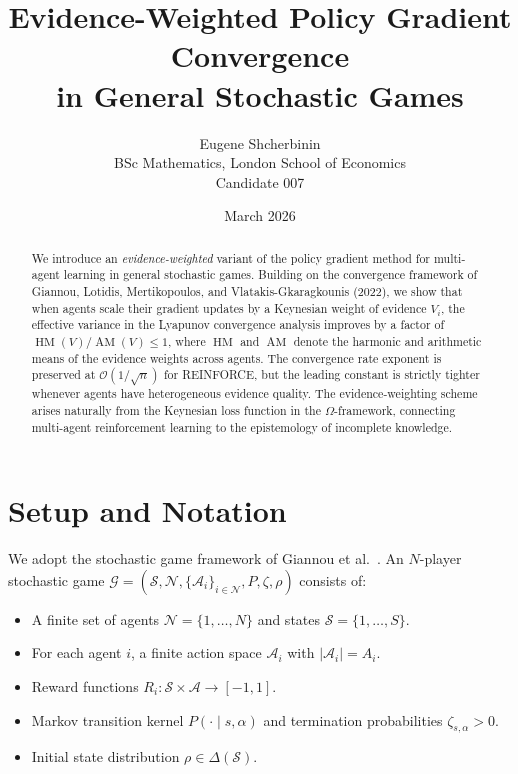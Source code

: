 \documentclass[11pt,a4paper]{article}
\title{Evidence-Weighted Policy Gradient Convergence\\in General Stochastic Games}
\author{Eugene Shcherbinin\\
\small BSc Mathematics, London School of Economics\\
\small Candidate 007}
\date{March 2026}
\DeclareMathOperator{\AM}{AM}
\DeclareMathOperator{\HM}{HM}
\newcommand{\cG}{\mathcal{G}}
\begin{document}
\maketitle

\begin{abstract}
We introduce an \emph{evidence-weighted} variant of the policy gradient method for multi-agent learning in general stochastic games. Building on the convergence framework of Giannou, Lotidis, Mertikopoulos, and Vlatakis-Gkaragkounis (2022), we show that when agents scale their gradient updates by a Keynesian weight of evidence $V_i$, the effective variance in the Lyapunov convergence analysis improves by a factor of $\HM(V)/\AM(V) \leq 1$, where $\HM$ and $\AM$ denote the harmonic and arithmetic means of the evidence weights across agents. The convergence rate exponent is preserved at $\mathcal{O}(1/\sqrt{n})$ for REINFORCE, but the leading constant is strictly tighter whenever agents have heterogeneous evidence quality. The evidence-weighting scheme arises naturally from the Keynesian loss function in the $\Omega$-framework, connecting multi-agent reinforcement learning to the epistemology of incomplete knowledge.
\end{abstract}

\tableofcontents

\section{Setup and Notation}
\label{sec:setup}

We adopt the stochastic game framework of Giannou et al.\ \cite{giannou2022}. An $N$-player stochastic game $\cG = (\mathcal{S}, \mathcal{N}, \{\mathcal{A}_i\}_{i \in \mathcal{N}}, P, \zeta, \rho)$ consists of:
\begin{itemize}
    \item A finite set of agents $\mathcal{N} = \{1, \ldots, N\}$ and states $\mathcal{S} = \{1, \ldots, S\}$.
    \item For each agent $i$, a finite action space $\mathcal{A}_i$ with $|\mathcal{A}_i| = A_i$.
    \item Reward functions $R_i : \mathcal{S} \times \mathcal{A} \to [-1, 1]$.
    \item Markov transition kernel $P(\cdot \mid s, \alpha)$ and termination probabilities $\zeta_{s,\alpha} > 0$.
    \item Initial state distribution $\rho \in \Delta(\mathcal{S})$.
\end{itemize}
\end{document}

